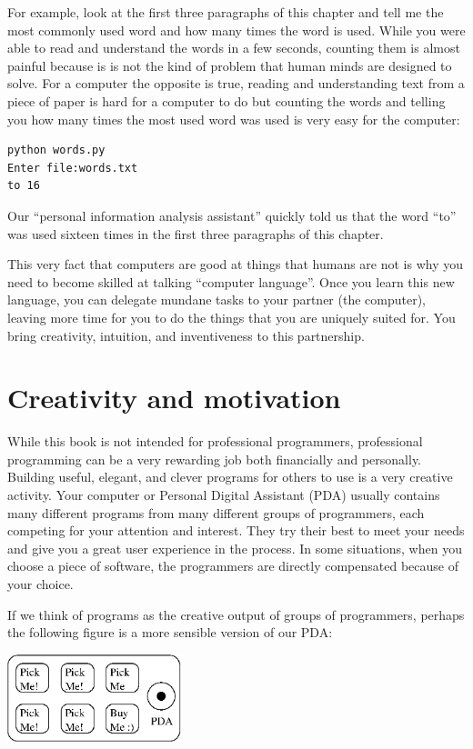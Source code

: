 \documentclass[10pt]{book}
\begin{document}
For example, look at the first three paragraphs of this
chapter and tell me the most commonly used word and how
many times the word is used.  While you were able to read
and understand the words in a few seconds, counting them
is almost painful because is is not the kind of problem 
that human minds are designed to solve.  For a computer
the opposite is true, reading and understanding text 
from a piece of paper is hard for a computer to do 
but counting the words and telling you how many times
the most used word was used is very easy for the
computer:

\beforeverb
\begin{verbatim}
python words.py
Enter file:words.txt
to 16
\end{verbatim}
\afterverb
%
Our ``personal information analysis assistant'' quickly 
told us that the word ``to'' was used sixteen times in the
first three paragraphs of this chapter.

This very fact that computers are good at things 
that humans are not is why you need to become
skilled at talking ``computer language''.  Once you learn
this new language, you can delegate mundane tasks
to your partner (the computer), leaving more time 
for you to do the 
things that you are uniquely suited for.  You bring 
creativity, intuition, and inventiveness to this
partnership.  

\section{Creativity and motivation}

While this book is not intended for professional programmers, professional
programming can be a very rewarding job both financially and personally.
Building useful, elegant, and clever programs for others to use is a very
creative activity.  Your computer or Personal Digital Assistant (PDA) 
usually contains many different programs from many different groups of 
programmers, each competing for your attention and interest.  They try 
their best to meet your needs and give you a great user experience in the
process.   In some situations, when you choose a piece of software, the 
programmers are directly compensated because of your choice.

If we think of programs as the creative output of groups of programmers,
perhaps the following figure is a more sensible version of our PDA:

\beforefig
\centerline{\includegraphics[height=1.00in]{figs2/pda2.eps}}
\afterfig
\end{document}
